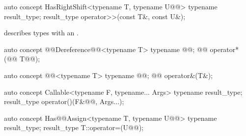 \documentclass[american,twoside]{book}
\begin{document}
\begin{itemdecl}
auto concept HasRightShift<typename T, typename U@@> {
  typename result_type;
  result_type operator>>(const T&, const U&);
}
\end{itemdecl}

\begin{itemdescr}
\pnum
\mbox{\reallynote} describes types with an \mbox{}.
\end{itemdescr}

\begin{itemdecl}
auto concept @@Dereference@@<typename T> {
  typename @@;
  @@ operator*(@@ T@\addedCC{\&}@);
}
\end{itemdecl}

\begin{itemdescr}
\pnum
{}
\end{itemdescr}

\begin{itemdecl}
auto concept @@<typename T> {
  typename @@;
  @@ operator&(T&);
}
\end{itemdecl}

\begin{itemdescr}
\pnum
{}
\end{itemdescr}

\begin{itemdecl}
auto concept Callable<typename F, typename... Args> {
  typename result_type;
  result_type operator()(F&@\addedCC{\&}@, Args...);
}
\end{itemdecl}

\begin{itemdescr}
\pnum 
{}
\end{itemdescr}

\begin{itemdecl}
auto concept Has@@Assign<typename T, typename U@@> {
  typename result_type;
  result_type T::operator=(U@\removedCCC{\&\&}@);
}
\end{itemdecl}
\end{document}
